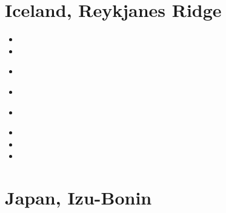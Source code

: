 \section{Iceland, Reykjanes Ridge}

\begin{small}
\begin{itemize}
\item[\nineteeneightynine]
\item[\nineteenninetysix]
\item[\nineteenninetynine]
\\ 
\item[\twothousand]
\item[\twothousandseventeen]
 \\
\item[\twothousandnineteen]
\item[\twothousandtwenty]
\item[\twothousandtwentytwo]
\end{itemize}
\end{small} 


\section{Japan, Izu-Bonin} 

